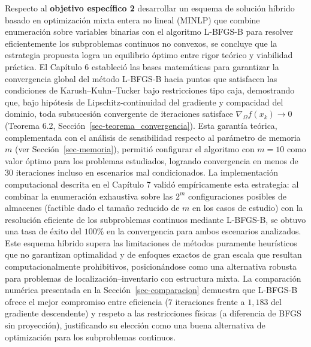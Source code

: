 \documentclass[
  spanish,
  us-letterpaper,
]{scrreprt}
\numberwithin{equation}{section}
\begin{document}
Respecto al \textbf{objetivo específico 2} desarrollar un esquema de
solución híbrido basado en optimización mixta entera no lineal (MINLP)
que combine enumeración sobre variables binarias con el algoritmo
L-BFGS-B para resolver eficientemente los subproblemas continuos no
convexos, se concluye que la estrategia propuesta logra un equilibrio
óptimo entre rigor teórico y viabilidad práctica. El Capítulo 6
estableció las bases matemáticas para garantizar la convergencia global
del método L-BFGS-B hacia puntos que satisfacen las condiciones de
Karush--Kuhn--Tucker bajo restricciones tipo caja, demostrando que, bajo
hipótesis de Lipschitz-continuidad del gradiente y compacidad del
dominio, toda subsucesión convergente de iteraciones satisface
\(\nabla_\Omega f(x_k) \to 0\) (Teorema 6.2,
Sección~\ref{sec-teorema_convergencia}). Esta garantía teórica,
complementada con el análisis de sensibilidad respecto al parámetro de
memoria \(m\) (ver Sección~\ref{sec-memoria}), permitió configurar el
algoritmo con \(m=10\) como valor óptimo para los problemas estudiados,
logrando convergencia en menos de \(30\) iteraciones incluso en
escenarios mal condicionados. La implementación computacional descrita
en el Capítulo 7 validó empíricamente esta estrategia: al combinar la
enumeración exhaustiva sobre las \(2^m\) configuraciones posibles de
almacenes (factible dado el tamaño reducido de \(m\) en los casos de
estudio) con la resolución eficiente de los subproblemas continuos
mediante L-BFGS-B, se obtuvo una tasa de éxito del \(100\%\) en la
convergencia para ambos escenarios analizados. Este esquema híbrido
supera las limitaciones de métodos puramente heurísticos que no
garantizan optimalidad y de enfoques exactos de gran escala que resultan
computacionalmente prohibitivos, posicionándose como una alternativa
robusta para problemas de localización--inventario con estructura mixta.
La comparación numérica presentada en la Sección~\ref{sec-comparacion}
demuestra que L-BFGS-B ofrece el mejor compromiso entre eficiencia
(\(7\) iteraciones frente a \(1,183\) del gradiente descendente) y
respeto a las restricciones físicas (a diferencia de BFGS sin
proyección), justificando su elección como una buena alternativa de
optimización para los subproblemas continuos.
\end{document}
